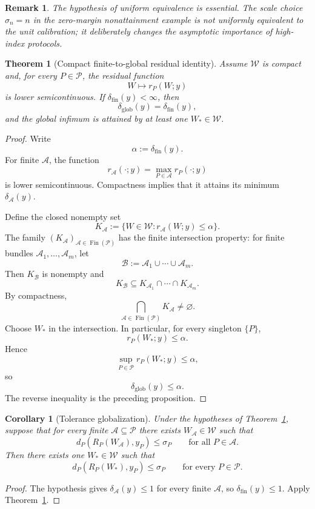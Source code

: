 \documentclass[11pt]{article}
\newtheorem{theorem}[definition]{Theorem}
\newtheorem{corollary}[definition]{Corollary}
\newtheorem{remark}[definition]{Remark}
\newcommand{\W}{\mathcal W}
\newcommand{\Pcal}{\mathcal P}
\newcommand{\Acal}{\mathcal A}
\newcommand{\Bcal}{\mathcal B}
\newcommand{\Fin}{\operatorname{Fin}}
\begin{document}
\begin{remark}
The hypothesis of uniform equivalence is essential. The scale choice
$\sigma_n=n$ in the zero-margin nonattainment example is not uniformly
equivalent to the unit calibration; it deliberately changes the asymptotic
importance of high-index protocols.
\end{remark}

\begin{theorem}[Compact finite-to-global residual identity]
\label{thm:robust-compact}
Assume $\W$ is compact and, for every $P\in\Pcal$, the residual function
\[
W\longmapsto r_P(W;y)
\]
is lower semicontinuous. If $\delta_{\mathrm{fin}}(y)<\infty$, then
\[
\delta_{\mathrm{glob}}(y)
=
\delta_{\mathrm{fin}}(y),
\]
and the global infimum is attained by at least one $W_\ast\in\W$.
\end{theorem}

\begin{proof}
Write
\[
\alpha:=\delta_{\mathrm{fin}}(y).
\]
For finite $\Acal$, the function
\[
r_{\Acal}(\cdot;y)
=
\max_{P\in\Acal}r_P(\cdot;y)
\]
is lower semicontinuous. Compactness implies that it attains its minimum
$\delta_{\Acal}(y)$.

Define the closed nonempty set
\[
K_{\Acal}
:=
\{W\in\W:r_{\Acal}(W;y)\le\alpha\}.
\]
The family $(K_{\Acal})_{\Acal\in\Fin(\Pcal)}$ has the finite intersection
property: for finite bundles $\Acal_1,\ldots,\Acal_m$, let
\[
\Bcal:=\Acal_1\cup\cdots\cup\Acal_m.
\]
Then $K_{\Bcal}$ is nonempty and
\[
K_{\Bcal}\subseteq
K_{\Acal_1}\cap\cdots\cap K_{\Acal_m}.
\]
By compactness,
\[
\bigcap_{\Acal\in\Fin(\Pcal)}K_{\Acal}\neq\varnothing.
\]
Choose $W_\ast$ in the intersection. In particular, for every singleton
$\{P\}$,
\[
r_P(W_\ast;y)\le\alpha.
\]
Hence
\[
\sup_{P\in\Pcal}r_P(W_\ast;y)\le\alpha,
\]
so
\[
\delta_{\mathrm{glob}}(y)\le\alpha.
\]
The reverse inequality is the preceding proposition.
\end{proof}

\begin{corollary}[Tolerance globalization]
Under the hypotheses of Theorem~\ref{thm:robust-compact}, suppose that for
every finite $\Acal\subseteq\Pcal$ there exists $W_{\Acal}\in\W$ such that
\[
d_P(R_P(W_{\Acal}),y_P)\le\sigma_P
\qquad
\text{for all }P\in\Acal.
\]
Then there exists one $W_\ast\in\W$ such that
\[
d_P(R_P(W_\ast),y_P)\le\sigma_P
\qquad
\text{for every }P\in\Pcal.
\]
\end{corollary}

\begin{proof}
The hypothesis gives $\delta_{\Acal}(y)\le1$ for every finite $\Acal$, so
$\delta_{\mathrm{fin}}(y)\le1$. Apply
Theorem~\ref{thm:robust-compact}.
\end{proof}
\end{document}
